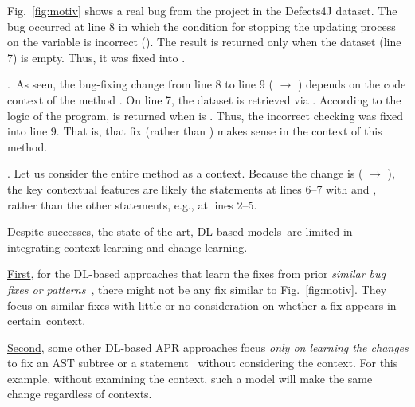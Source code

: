 Fig.~\ref{fig:motiv} shows a real bug from the project 
in the Defects4J dataset. The bug occurred at line 8 in which the
condition for stopping the updating process on the 
variable is incorrect (). The result is
returned only when the dataset (line 7) is empty. Thus, it was fixed
into .

.~As
seen, the bug-fixing change from line 8 to line 9 ( $\rightarrow$ ) depends on the
code context of the method . On line 7, the
dataset is retrieved via . According to the logic of
the program,  is returned when  is
.  Thus, the incorrect checking was fixed into line 9. That
is, that fix  (rather than ) makes sense in the context of this method.


\vspace{2pt}
. Let us consider the entire method as a
context. Because the change is ( \code{!=}
 $\rightarrow$  \code{==} ),
the key contextual features are likely the statements at lines 6--7
with  and , rather than the other
statements, e.g., at lines 2--5.


Despite successes, the state-of-the-art, DL-based models~are
limited in integrating context learning and change learning.

\underline{First}, for the DL-based approaches that learn the fixes
from prior {\em similar bug fixes or
  patterns}~\cite{gupta2017deepfix,white2019sorting,white2016deep},
there might not be any fix similar to Fig.~\ref{fig:motiv}. They focus
on similar fixes with little or no consideration on whether a fix
appears in certain~context.

\underline{Second}, some other DL-based APR approaches focus {\em only
  on learning the changes} to fix an AST subtree or a
statement~\cite{chakrabortycodit,see2017get} without considering the
context. For this example, without examining the context,
such a model will make the same change regardless of contexts.

